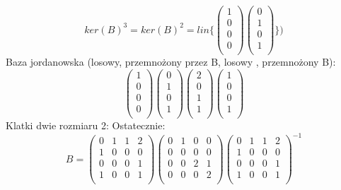 \documentclass{article}
\begin{document}
$$
ker(B)^3 = ker(B)^2 = lin \{\begin{pmatrix}
 1\\
 0\\
 0\\
 0\\
\end{pmatrix}
\begin{pmatrix}
 0\\
 1\\
 0\\
 1\\
\end{pmatrix}\})
$$
Baza jordanowska (losowy, przemnożony przez B, losowy , przemnożony B):
$$
\begin{pmatrix}
 1\\
 0\\
 0\\
 0\\
\end{pmatrix}
\begin{pmatrix}
 0\\
 1\\
 0\\
 1\\
\end{pmatrix}
\begin{pmatrix}
 2\\
 0\\
 1\\
 1\\
\end{pmatrix}
\begin{pmatrix}
 1\\
 0\\
 0\\
 1\\
\end{pmatrix}
$$
Klatki  dwie rozmiaru 2:
Ostatecznie:
$$
B =
\begin{pmatrix}
 0 & 1 & 1 & 2\\
 1 & 0 & 0 & 0\\
 0 & 0 & 0 & 1\\
 1 & 0 & 0 & 1\\
\end{pmatrix}
\begin{pmatrix}
 0 & 1 & 0 & 0\\
 0 & 0 & 0 & 0\\
 0 & 0 & 2 & 1\\
 0 & 0 & 0 & 2\\
\end{pmatrix}
\begin{pmatrix}
 0 & 1 & 1 & 2\\
 1 & 0 & 0 & 0\\
 0 & 0 & 0 & 1\\
 1 & 0 & 0 & 1\\
\end{pmatrix}^{-1}
$$\\\\\\\\\\\\\\\\
\end{document}
